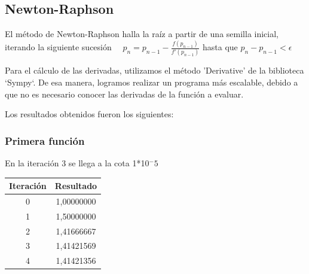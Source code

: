 \documentclass[titlepage,a4paper]{article}
\begin{document}
\subsection{Newton-Raphson}\label{sec:NewtonRaphson}
El método de Newton-Raphson halla la raíz a partir de una semilla inicial, iterando la siguiente sucesión
$\quad p_{n} =p_{n-1}-\frac{f (p_{n-1})}{f'(p_{n-1})}$ hasta que 
$p_{n}-p_{n-1} < \mbox{$\epsilon$}$


Para el cálculo de las derivadas, utilizamos el método 'Derivative' de la biblioteca `Sympy`. De esa manera, logramos realizar un programa más escalable, debido a que no es necesario conocer las derivadas de la función a evaluar.

Los resultados obtenidos fueron los siguientes:

\subsubsection{Primera función}\label{sec:NR1}
En la iteración 3 se llega a la cota 1*10$^-5$
\begin{center}
\begin{tabular}{| c | c |}
\hline
 Iteración & Resultado \\ \hline
    0     & 1,00000000 \\
    1     & 1,50000000 \\
    2     & 1,41666667 \\
    3     & 1,41421569 \\
    4     & 1,41421356 \\
\hline
\end{tabular}
\end{center}
\end{document}
